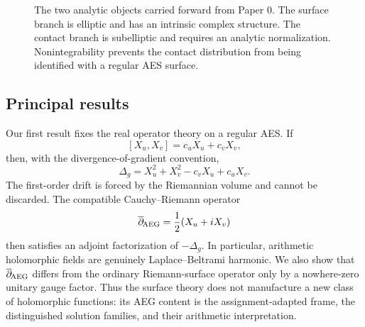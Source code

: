 \begin{figure}[t]
\centering
{}
\caption{The two analytic objects carried forward from Paper 0.  The surface branch
is elliptic and has an intrinsic complex structure.  The contact branch is
subelliptic and requires an analytic normalization.  Nonintegrability prevents the
contact distribution from being identified with a regular AES surface.}
\label{fig:two-analytic-layers}
\end{figure}

\subsection{Principal results}

Our first result fixes the real operator theory on a regular AES.  If
\[
 [X_u,X_v]=c_uX_u+c_vX_v,
\]
then, with the divergence-of-gradient convention,
\begin{equation}\label{eq:intro-surface-laplacian}
 \Delta_g=X_u^2+X_v^2-c_vX_u+c_uX_v.
\end{equation}
The first-order drift is forced by the Riemannian volume and cannot be discarded.
The compatible Cauchy--Riemann operator
\[
 \overline\partial_{\!\mathrm{AEG}}=\frac12(X_u+iX_v)
\]
then satisfies an adjoint factorization of $-\Delta_g$.  In particular,
arithmetic holomorphic fields are genuinely Laplace--Beltrami harmonic.  We also
show that $\overline\partial_{\!\mathrm{AEG}}$ differs from the ordinary Riemann-surface operator only by a
nowhere-zero unitary gauge factor.  Thus the surface theory does not manufacture a
new class of holomorphic functions: its AEG content is the assignment-adapted frame,
the distinguished solution families, and their arithmetic interpretation.

